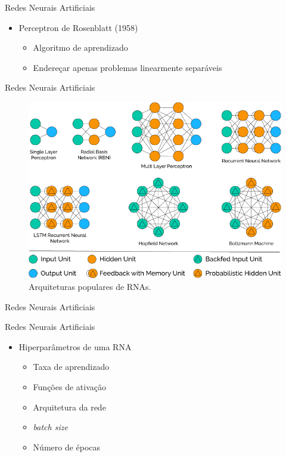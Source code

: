\begin{frame}{Redes Neurais Artificiais}
   \ \  \\[0.1cm]
  \begin{itemize}
  \item Perceptron de Rosenblatt (1958)
  \begin{itemize}
    \item Algoritmo de aprendizado
    \item Endereçar apenas problemas linearmente separáveis
  \end{itemize}
\end{itemize}
\end{frame}

\begin{frame}{Redes Neurais Artificiais}
   \ \  \\[0.1cm]
   \begin{figure}[!h]
   	\caption{Arquiteturas populares de RNAs.}
   	\label{fig:popular_archs}
   	\includegraphics[width=\linewidth]{img/popular_archs}
   \end{figure}
\end{frame}

\begin{frame}{Redes Neurais Artificiais}
   \ \  \\[0.1cm]
   
\end{frame}

\begin{frame}{Redes Neurais Artificiais}
   \ \  \\[0.1cm]
   \begin{itemize}
     \item Hiperparâmetros de uma RNA
     \begin{itemize}
       \item Taxa de aprendizado
       \item Funções de ativação
       \item Arquitetura da rede
       \item \emph{batch size}
       \item Número de épocas
     \end{itemize}
   \end{itemize}
\end{frame}

